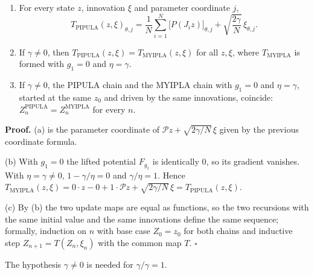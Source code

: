 \documentclass[11pt,a4paper]{article}
\begin{document}
\begin{enumerate}


\item For every state \(z\), innovation \(\xi\) and parameter coordinate \(j\),
\[T_{\mathrm{PIPULA}}(z,\xi)_{\theta,j}=\frac1N\sum_{i=1}^N\bigl[P(J_iz)\bigr]_{\theta,j}+\sqrt{\frac{2\gamma}N}\,\xi_{\theta,j}.\]

\item If \(\gamma\ne0\), then \(T_{\mathrm{PIPULA}}(z,\xi)=T_{\mathrm{MYIPLA}}(z,\xi)\) for all \(z,\xi\), where \(T_{\mathrm{MYIPLA}}\) is formed with \(g_1=0\) and \(\eta=\gamma\).

\item If \(\gamma\ne0\), the PIPULA chain and the MYIPLA chain with \(g_1=0\) and \(\eta=\gamma\), started at the same \(z_0\) and driven by the same innovations, coincide: \(Z_n^{\mathrm{PIPULA}}=Z_n^{\mathrm{MYIPLA}}\) for every \(n\).

\end{enumerate}



\textbf{Proof.} (a) is the parameter coordinate of \(\mathcal Pz+\sqrt{2\gamma/N}\,\xi\) given by the previous coordinate formula.




(b) With \(g_1=0\) the lifted potential \(F_{g_1}\) is identically \(0\), so its gradient vanishes. With \(\eta=\gamma\ne0\), \(1-\gamma/\eta=0\) and \(\gamma/\eta=1\). Hence \(T_{\mathrm{MYIPLA}}(z,\xi)=0\cdot z-0+1\cdot\mathcal Pz+\sqrt{2\gamma/N}\,\xi=T_{\mathrm{PIPULA}}(z,\xi)\).




(c) By (b) the two update maps are equal as functions, so the two recursions with the same initial value and the same innovations define the same sequence; formally, induction on \(n\) with base case \(Z_0=z_0\) for both chains and inductive step \(Z_{n+1}=T(Z_n,\xi_n)\) with the common map \(T\). \(\square\)




The hypothesis \(\gamma\ne0\) is needed for \(\gamma/\gamma=1\).
\end{document}
